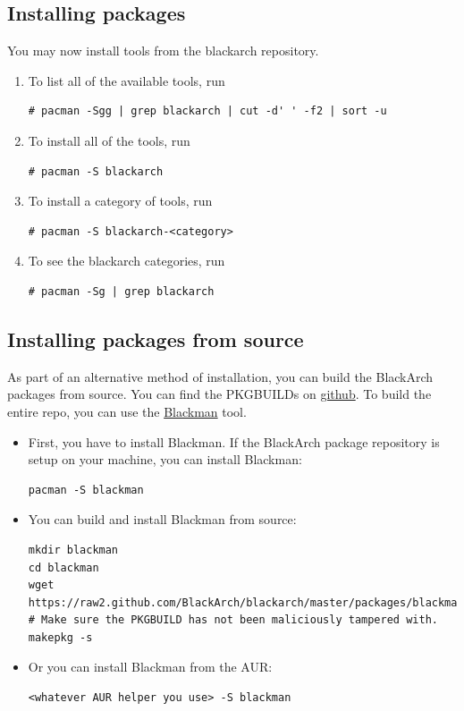 \documentclass[a4paper, oneside, 11pt]{book}
\begin{document}
\subsection{Installing packages}
You may now install tools from the blackarch repository.
\begin{enumerate}
\item To list all of the available tools, run
{\small
\color{gray}
\begin{verbatim}
# pacman -Sgg | grep blackarch | cut -d' ' -f2 | sort -u
\end{verbatim}
}
\item To install all of the tools, run
{\small
\color{gray}
\begin{verbatim}
# pacman -S blackarch
\end{verbatim}
}
\item To install a category of tools, run
{\small
\color{gray}
\begin{verbatim}
# pacman -S blackarch-<category>
\end{verbatim}
}
\item To see the blackarch categories, run
{\small
\color{gray}
\begin{verbatim}
# pacman -Sg | grep blackarch
\end{verbatim}
}
\end{enumerate}

\subsection{Installing packages from source}
As part of an alternative method of installation, you can build the BlackArch
packages from source. You can find the PKGBUILDs on
\href{https://github.com/BlackArch/blackarch/tree/master/packages}{github}. To
build the entire repo, you can use the
\href{https://github.com/BlackArch/blackman}{Blackman} tool.
\begin{itemize}
\item First, you have to install Blackman. If the BlackArch package repository
is setup on your machine, you can install Blackman:
{\small
\begin{verbatim}
pacman -S blackman
\end{verbatim}
}
\item You can build and install Blackman from source:
{\small
\color{gray}
\begin{verbatim}
mkdir blackman
cd blackman
wget https://raw2.github.com/BlackArch/blackarch/master/packages/blackman/PKGBUILD
# Make sure the PKGBUILD has not been maliciously tampered with.
makepkg -s
\end{verbatim}
}
\item Or you can install Blackman from the AUR:
{\small
\color{gray}
\begin{verbatim}
<whatever AUR helper you use> -S blackman
\end{verbatim}
}
\end{itemize}
\end{document}

